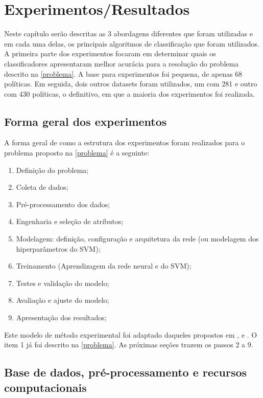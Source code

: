 \chapter{Experimentos/Resultados}\label{resultados}
Neste capítulo serão descritas as 3 abordagens diferentes que foram utilizadas e em cada uma delas, os principais algoritmos de classificação que foram utilizados. A primeira parte dos experimentos focaram em determinar quais os classificadores apresentaram melhor acurácia para a resolução do problema descrito na \autoref{problema}. A base para experimentos foi pequena, de apenas 68 políticas. Em seguida, dois outros datasets foram utilizados, um com 281 e outro com 430 políticas, o definitivo, em que a maioria dos experimentos foi realizada.

\section{Forma geral dos experimentos}\label{forma_geral_experimentos}
A forma geral de como a estrutura dos experimentos foram realizados para o problema proposto na \autoref{problema} é a seguinte:
\begin{enumerate}
	\item Definição do problema;
	\item Coleta de dados;
	\item Pré-processamento dos dados;
	\item Engenharia e seleção de atributos;
	\item Modelagem: definição, configuração e arquitetura da rede (ou modelagem dos hiperparâmetros do SVM);
	\item Treinamento (Aprendizagem da rede neural e do SVM);
	\item Testes e validação do modelo;
		\item Avaliação e ajuste do modelo;
	\item Apresentação dos resultados;
\end{enumerate}

Este modelo de método experimental foi adaptado daqueles propostos em ,  e . O item 1 já foi descrito na \autoref{problema}. As próximas seções trazem os passos 2 a 9.

\section{Base de dados, pré-processamento e recursos computacionais}\label{base_dados-pre-recursos}
